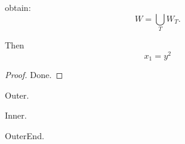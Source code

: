 \documentclass{IEEEtran}
\begin{document}
\begin{IEEEproof}
obtain: $$W= \bigcup_T W_T.$$
\IEEEQEDoff
\end{IEEEproof}
\begin{IEEEproof}
Then
$$x_1 = y^2$$
\end{IEEEproof}
\begin{proof}
Done. \IEEEQEDoff
\end{proof}
\begin{IEEEproof}
Outer. \IEEEQEDoff
\begin{IEEEproof}
Inner.
\end{IEEEproof}
OuterEnd.
\end{IEEEproof}
\end{document}
